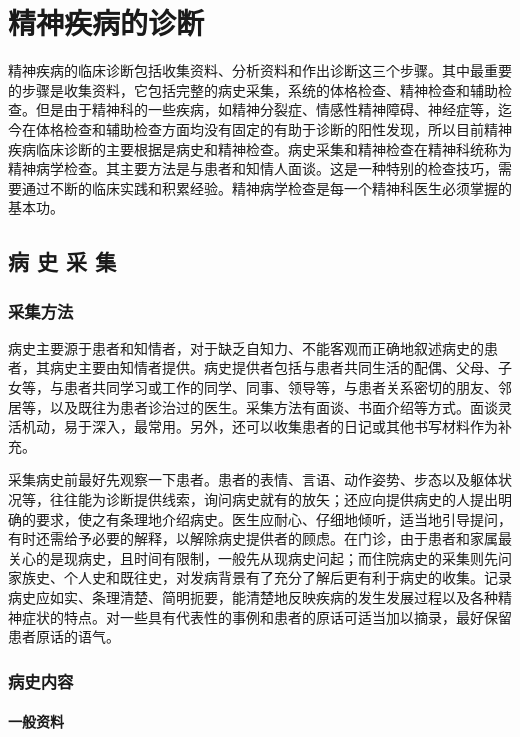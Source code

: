 \chapter{精神疾病的诊断}

精神疾病的临床诊断包括收集资料、分析资料和作出诊断这三个步骤。其中最重要的步骤是收集资料，它包括完整的病史采集，系统的体格检查、精神检查和辅助检查。但是由于精神科的一些疾病，如精神分裂症、情感性精神障碍、神经症等，迄今在体格检查和辅助检查方面均没有固定的有助于诊断的阳性发现，所以目前精神疾病临床诊断的主要根据是病史和精神检查。病史采集和精神检查在精神科统称为精神病学检查。其主要方法是与患者和知情人面谈。这是一种特别的检查技巧，需要通过不断的临床实践和积累经验。精神病学检查是每一个精神科医生必须掌握的基本功。

\section{病 史 采 集}

\subsection{采集方法}

病史主要源于患者和知情者，对于缺乏自知力、不能客观而正确地叙述病史的患者，其病史主要由知情者提供。病史提供者包括与患者共同生活的配偶、父母、子女等，与患者共同学习或工作的同学、同事、领导等，与患者关系密切的朋友、邻居等，以及既往为患者诊治过的医生。采集方法有面谈、书面介绍等方式。面谈灵活机动，易于深入，最常用。另外，还可以收集患者的日记或其他书写材料作为补充。

采集病史前最好先观察一下患者。患者的表情、言语、动作姿势、步态以及躯体状况等，往往能为诊断提供线索，询问病史就有的放矢；还应向提供病史的人提出明确的要求，使之有条理地介绍病史。医生应耐心、仔细地倾听，适当地引导提问，有时还需给予必要的解释，以解除病史提供者的顾虑。在门诊，由于患者和家属最关心的是现病史，且时间有限制，一般先从现病史问起；而住院病史的采集则先问家族史、个人史和既往史，对发病背景有了充分了解后更有利于病史的收集。记录病史应如实、条理清楚、简明扼要，能清楚地反映疾病的发生发展过程以及各种精神症状的特点。对一些具有代表性的事例和患者的原话可适当加以摘录，最好保留患者原话的语气。

\subsection{病史内容}

\subsubsection{一般资料}

